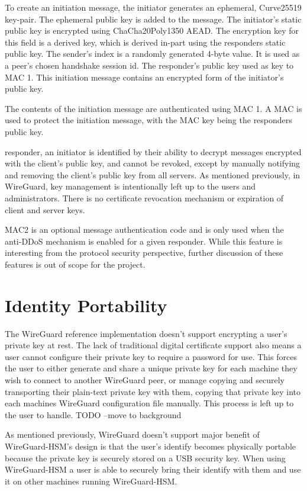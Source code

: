 \documentclass [11pt, proquest] {uwthesis}[2020/02/24]
\begin{document}
To create an initiation message, the initiator generates an ephemeral, Curve25519 key-pair. The ephemeral public key is added to the message. The initiator's static public key is encrypted using ChaCha20Poly1350 AEAD. The encryption key for this field is a derived key, which is derived in-part using the responders static public key.
The sender's index is a randomly generated 4-byte value. It is used as a peer's chosen handshake session id.
The responder's public key used as key to MAC 1. This initiation message contains an encrypted form of the initiator's public key.

The contents of the initiation message are authenticated using MAC 1.
A MAC is used to protect the initiation message, with the MAC key being the responders public key.

responder, an initiator is identified by their ability to decrypt messages encrypted with the client's public key, and cannot be revoked, except by manually notifying and removing the client’s public key from all servers. As mentioned previously, in WireGuard, key management is intentionally left up to the users and administrators. There is no certificate revocation mechanism or expiration of client and server keys.

MAC2 is an optional message authentication code and is only used when the anti-DDoS mechanism is enabled for a given responder. While this feature is interesting from the protocol security perspective, further discussion of these features is out of scope for the project.

\section {Identity Portability}
The WireGuard reference implementation doesn't support encrypting a user's private key at rest. The lack of traditional digital certificate support also means a user cannot configure their private key to require a password for use. This forces the user to either generate and share a unique private key for each machine they wish to connect to another WireGuard peer, or manage copying and securely transporting their plain-text private key with them, copying that private key into each machines WireGuard configuration file manually. This process is left up to the user to handle. TODO --move to background

As mentioned previously, WireGuard doesn't support major benefit of WireGuard-HSM's design is that the user's identify becomes physically portable because the private key is securely stored on a USB security key. When using WireGuard-HSM a user is able to securely bring their identify with them and use it on other machines running WireGuard-HSM. 
\end{document}
